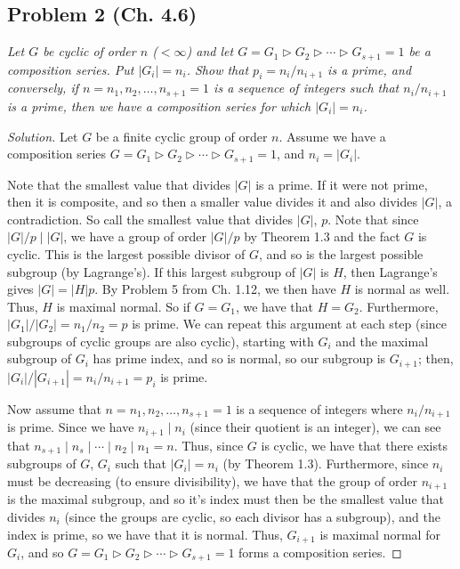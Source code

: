 \documentclass{article}
\begin{document}
\subsection*{Problem 2 (Ch. 4.6)}
{\it Let $G$ be cyclic of order $n$ ($< \infty$) and let
$G = G_1 \triangleright G_2 \triangleright \cdots \triangleright G_{s+1} = 1$
be a composition series.
Put $|G_i| = n_i$.
Show that $p_i = n_i/n_{i+1}$ is a prime, and conversely,
if $n = n_1,n_2,\dots,n_{s+1} = 1$ is a sequence of integers such that
$n_i/n_{i+1}$ is a prime, then we have a composition series for which $|G_i|=n_i$.}
\begin{proof}[Solution]\let\qed\relax
	Let $G$ be a finite cyclic group of order $n$.
	Assume we have a composition series
	$G = G_1 \triangleright G_2 \triangleright \cdots \triangleright G_{s+1} = 1$,
	and $n_i = |G_i|$.

	Note that the smallest value that divides $|G|$ is a prime.
	If it were not prime, then it is composite,
	and so then a smaller value divides it and also divides $|G|$, a contradiction.
	So call the smallest value that divides $|G|$, $p$.
	Note that since $|G|/p \mid |G|$, we have a group of order
	$|G|/p$ by Theorem 1.3 and the fact $G$ is cyclic.
	This is the largest possible divisor of $G$,
	and so is the largest possible subgroup (by Lagrange's).
	If this largest subgroup of $|G|$ is $H$, then Lagrange's gives
	$|G| = |H|p$.
	By Problem 5 from Ch. 1.12, we then have $H$ is normal as well.
	Thus, $H$ is maximal normal.
	So if $G = G_1$, we have that $H = G_2$.
	Furthermore, $|G_1|/|G_2| = n_1/n_2 = p$ is prime.
	We can repeat this argument at each step
	(since subgroups of cyclic groups are also cyclic),
	starting with $G_i$ and the maximal subgroup of $G_i$ has
	prime index, and so is normal, so our subgroup is $G_{i+1}$;
	then, $|G_i|/|G_{i+1}| = n_i/n_{i+1} = p_i$ is prime.

	Now assume that $n = n_1, n_2, \dots, n_{s+1} = 1$
	is a sequence of integers where $n_i/n_{i+1}$ is prime.
	Since we have $n_{i+1} \mid n_i$ (since their quotient is an integer),
	we can see that $n_{s+1} \mid n_s \mid \cdots \mid n_2 \mid n_1 = n$.
	Thus, since $G$ is cyclic, we have that there exists
	subgroups of $G$, $G_i$ such that $|G_i| =  n_i$
	(by Theorem 1.3).
	Furthermore, since $n_i$ must be decreasing (to ensure divisibility),
	we have that the group of order $n_{i+1}$ is the maximal subgroup,
	and so it's index must then be the smallest value that divides $n_i$
	(since the groups are cyclic, so each divisor has a subgroup),
	and the index is prime,
	so we have that it is normal.
	Thus, $G_{i+1}$ is maximal normal for $G_i$,
	and so $G = G_1 \triangleright G_2 \triangleright \cdots \triangleright G_{s+1} = 1$
	forms a composition series.
\end{proof}
\end{document}
